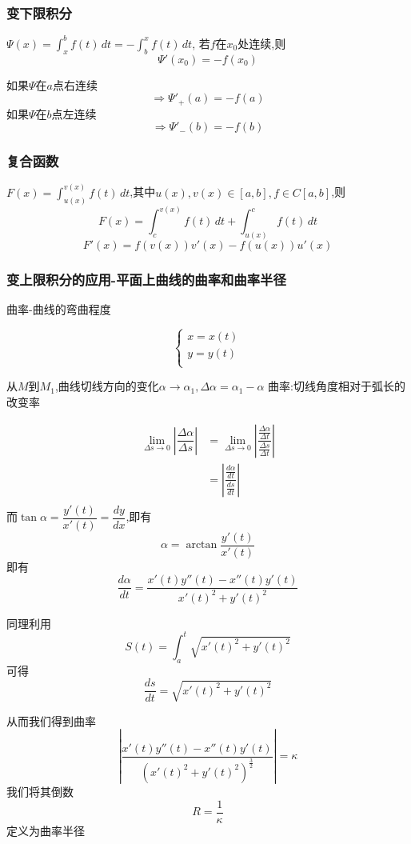 \documentclass[11pt,hyperref,a4paper,UTF8]{ctexart}
\newcommand{\abs}[1]{\left|#1\right|}
\begin{document}
\begin{CJK}{UTF8}{gkai}
\subsubsection{变下限积分}

$\Psi(x) = \int_{x}^{b} f(t)\, dt = -\int_{b}^{x} f(t)\, dt $,
若$f$在$x_0$处连续,则
\[\Psi'(x_0) = -f(x_0)\]

如果$\Psi$在$a$点右连续\[\Rightarrow \Psi'_+(a) = -f(a)\]
如果$\Psi$在$b$点左连续\[\Rightarrow \Psi'_-(b) = -f(b)\]

\subsubsection{复合函数}
$F(x) = \int_{u(x)}^{v(x)} f(t)\, dt $,其中$u(x),v(x)\in[a,b],f\in C[a,b]$,则
\[F(x) = \int_{c}^{v(x)} f(t)\, dt + \int_{u(x)}^{c} f(t)\, dt\]
\[F'(x) = f(v(x)) v'(x) - f(u(x))u'(x)\]

\subsubsection{变上限积分的应用-平面上曲线的曲率和曲率半径}

曲率-曲线的弯曲程度

\begin{equation*}
  \begin{cases}
    x = x(t)\\
    y = y(t)\\
  \end{cases}
\end{equation*}

从$M$到$M_1$,曲线切线方向的变化$\alpha \to \alpha_1,\Delta \alpha = \alpha_1 - \alpha$
曲率:切线角度相对于弧长的改变率

\[
\begin{aligned}
\lim_{\Delta s \to 0}\abs{\dfrac{\Delta \alpha}{\Delta s}}
&= \lim_{\Delta s \to 0}\abs{\dfrac{\frac{\Delta \alpha}{\Delta t}}{\frac{\Delta s}{\Delta t}}}\\
&= \abs{\dfrac{\frac{d \alpha}{d t}}{\frac{d s}{d t}}}\\
\end{aligned}
\]
而$\tan \alpha = \dfrac{y'(t)}{x'(t)} = \dfrac{dy}{dx}$,即有
\[\alpha = \arctan \dfrac{y'(t)}{x'(t)}\]
即有\[\dfrac{d \alpha}{d t} =\dfrac{x'(t) y''(t) - x''(t) y'(t)}{x'(t)^2 + y'(t)^2}\]

同理利用\[S(t) = \int_{a}^{t} \sqrt{x'(t)^2 + y'(t)^2}\]
可得\[\dfrac{ds}{dt}= \sqrt{x'(t)^2 + y'(t)^2}\]

从而我们得到曲率
\[\abs{\dfrac{x'(t) y''(t) - x''(t) y'(t)}{(x'(t)^2 + y'(t)^2)^{\frac{3}{2}}} }= \kappa\] 
我们将其倒数
\[R = \dfrac{1}{\kappa}\]
定义为曲率半径\\


\end{CJK}
\end{document}
